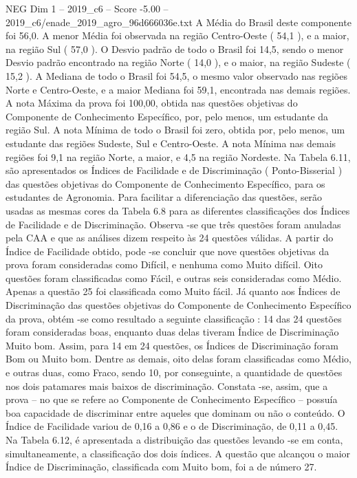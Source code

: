 \begin{textsample}{NEG Dim 1 – 2019\_c6 – Score -5.00 – 2019\_c6/enade\_2019\_agro\_96d666036e.txt}
A Média do Brasil deste componente foi 56,0.
A menor Média foi observada na região Centro-Oeste ( 54,1 ), e a maior, na região Sul ( 57,0 ).
O Desvio padrão de todo o Brasil foi 14,5, sendo o menor Desvio padrão encontrado na região Norte ( 14,0 ), e o maior, na região Sudeste ( 15,2 ).
A Mediana de todo o Brasil foi 54,5, o mesmo valor observado nas regiões Norte e Centro-Oeste, e a maior Mediana foi 59,1, encontrada nas demais regiões.
A nota Máxima da prova foi 100,00, obtida nas questões objetivas do Componente de Conhecimento Específico, por, pelo menos, um estudante da região Sul.
A nota Mínima de todo o Brasil foi zero, obtida por, pelo menos, um estudante das regiões Sudeste, Sul e Centro-Oeste.
A nota Mínima nas demais regiões foi 9,1 na região Norte, a maior, e 4,5 na região Nordeste.
Na Tabela 6.11, são apresentados os Índices de Facilidade e de Discriminação ( Ponto-Bisserial ) das questões objetivas do Componente de Conhecimento Específico, para os estudantes de Agronomia.
Para facilitar a diferenciação das questões, serão usadas as mesmas cores da Tabela 6.8 para as diferentes classificações dos Índices de Facilidade e de Discriminação.
Observa -se que três questões foram anuladas pela CAA e que as análises dizem respeito às 24 questões válidas.
A partir do Índice de Facilidade obtido, pode -se concluir que nove questões objetivas da prova foram consideradas como Difícil, e nenhuma como Muito difícil.
Oito questões foram classificadas como Fácil, e outras seis consideradas como Médio.
Apenas a questão 25 foi classificada como Muito fácil.
Já quanto aos Índices de Discriminação das questões objetivas do Componente de Conhecimento Específico da prova, obtém -se como resultado a seguinte classificação : 14 das 24 questões foram consideradas boas, enquanto duas delas tiveram Índice de Discriminação Muito bom.
Assim, para 14 em 24 questões, os Índices de Discriminação foram Bom ou Muito bom.
Dentre as demais, oito delas foram classificadas como Médio, e outras duas, como Fraco, sendo 10, por conseguinte, a quantidade de questões nos dois patamares mais baixos de discriminação.
Constata -se, assim, que a prova – no que se refere ao Componente de Conhecimento Específico – possuía boa capacidade de discriminar entre aqueles que dominam ou não o conteúdo.
O Índice de Facilidade variou de 0,16 a 0,86 e o de Discriminação, de 0,11 a 0,45.
Na Tabela 6.12, é apresentada a distribuição das questões levando -se em conta, simultaneamente, a classificação dos dois índices.
A questão que alcançou o maior Índice de Discriminação, classificada com Muito bom, foi a de número 27.

\end{textsample}
